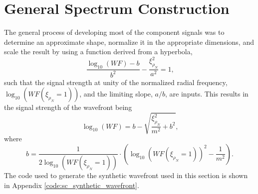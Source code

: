 \section{General Spectrum Construction}
The general process of developing most of the component signals was to determine an approximate shape, normalize it in the appropriate dimensions, and scale the result by using a function derived from a hyperbola,
\begin{equation}
 \frac{\log_{10}(WF)-b}{b^2}-\frac{\xi_{\rho_N}^2}{a^2} = 1 \textrm{,}
 \label{eqn:05_scaling_hyperbola}
\end{equation}
such that the signal strength at unity of the normalized radial frequency, $\log_{10}(WF(\xi_{\rho_N}=1))$, and the limiting slope, $a/b$, are inputs.
This results in the signal strength of the wavefront being
\begin{equation}
 \log_{10}(WF) = b-\sqrt{\frac{\xi_{\rho_N}^2}{m^2}+b^2} \textrm{,}
 \label{eqn:05_wavefront_strength}
\end{equation}
where
\begin{equation}
 b = \frac{1}{2\log_{10}(WF(\xi_{\rho_N}=1))}\cdot\left(\log_{10}(WF(\xi_{\rho_N}=1))^2-\frac{1}{m^2}\right) \textrm{.}
 \label{eqn:05_wavefront_strength_b}
\end{equation}
The code used to generate the synthetic wavefront used in this section is shown in Appendix \ref{code:sc_synthetic_wavefront}.

